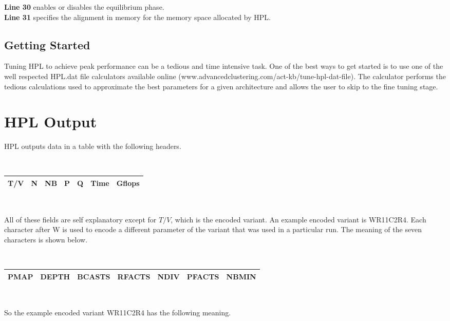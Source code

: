 \documentclass[a4paper, 11pt]{article}
\begin{document}
	\noindent\textbf{\large Line 30} enables or disables the equilibrium phase. \\
	
	\noindent\textbf{\large Line 31} specifies the alignment in memory for the memory space allocated by HPL.

\subsection{Getting Started}
Tuning HPL to achieve peak performance can be a tedious and time intensive task. One of the best ways to get started is to use one of the well respected HPL.dat file calculators available online (www.advancedclustering.com/act-kb/tune-hpl-dat-file). The calculator performs the tedious calculations used to approximate the best parameters for a given architecture and allows the user to skip to the fine tuning stage.

\section{HPL Output}

HPL outputs data in a table with the following headers.

\

\begin{tabular}{ | l | l | l | l | l | l | l | }
	\hline
	T/V & N & NB & P & Q & Time & Gflops \\ 
	\hline
\end{tabular}

\

All of these fields are self explanatory except for $T/V$, which is the encoded variant. An example encoded variant is WR11C2R4. Each character after W is used to encode a different parameter of the variant that was used in a particular run. The meaning of the seven characters is shown below.  

\

\begin{tabular}{ | l | l | l | l | l | l | l | }
	\hline
	PMAP & DEPTH & BCASTS & RFACTS & NDIV & PFACTS & NBMIN \\ 
	\hline
\end{tabular}

\

So the example encoded variant WR11C2R4 has the following meaning.

\
\end{document}
